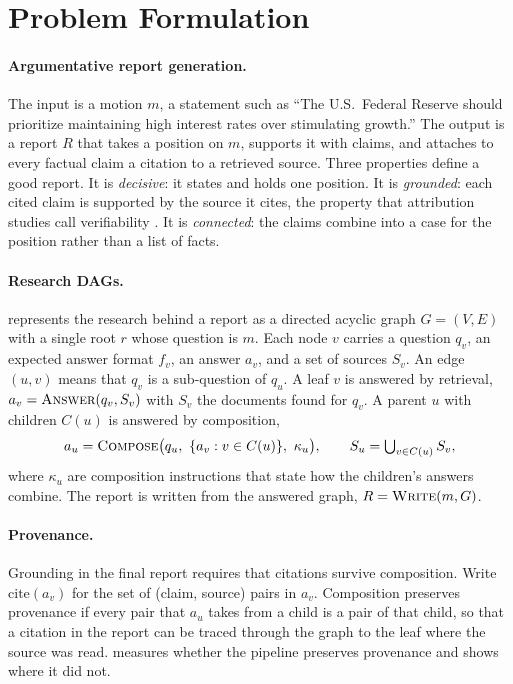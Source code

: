 \section{Problem Formulation}
\label{sec:problem}

\paragraph{Argumentative report generation.}
The input is a motion $m$, a statement such as ``The U.S.\ Federal Reserve should prioritize maintaining high interest rates over stimulating growth.'' The output is a report $R$ that takes a position on $m$, supports it with claims, and attaches to every factual claim a citation to a retrieved source. Three properties define a good report. It is \emph{decisive}: it states and holds one position. It is \emph{grounded}: each cited claim is supported by the source it cites, the property that attribution studies call verifiability \citep{rashkin2023ais, liu2023verifiability}. It is \emph{connected}: the claims combine into a case for the position rather than a list of facts.

\paragraph{Research DAGs.}
\sys{} represents the research behind a report as a directed acyclic graph $G = (V, E)$ with a single root $r$ whose question is $m$. Each node $v$ carries a question $q_v$, an expected answer format $f_v$, an answer $a_v$, and a set of sources $S_v$. An edge $(u, v)$ means that $q_v$ is a sub-question of $q_u$. A leaf $v$ is answered by retrieval, $a_v = \textsc{Answer}(q_v, S_v)$ with $S_v$ the documents found for $q_v$. A parent $u$ with children $C(u)$ is answered by composition,
\begin{equation}
a_u = \textsc{Compose}\big(q_u,\ \{a_v : v \in C(u)\},\ \kappa_u\big), \qquad S_u = \textstyle\bigcup_{v \in C(u)} S_v,
\label{eq:compose}
\end{equation}
where $\kappa_u$ are composition instructions that state how the children's answers combine. The report is written from the answered graph, $R = \textsc{Write}(m, G)$.

\paragraph{Provenance.}
Grounding in the final report requires that citations survive composition. Write $\mathrm{cite}(a_v)$ for the set of (claim, source) pairs in $a_v$. Composition preserves provenance if every pair that $a_u$ takes from a child is a pair of that child, so that a citation in the report can be traced through the graph to the leaf where the source was read.  measures whether the pipeline preserves provenance and shows where it did not.
